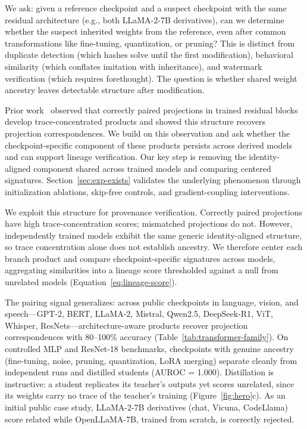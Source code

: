\documentclass[letterpaper]{article}
\begin{document}
We ask: given a reference checkpoint and a suspect checkpoint with the same residual architecture (e.g., both LLaMA-2-7B derivatives), can we determine whether the suspect inherited weights from the reference, even after common transformations like fine-tuning, quantization, or pruning? This is distinct from duplicate detection (which hashes solve until the first modification), behavioral similarity (which conflates imitation with inheritance), and watermark verification (which requires forethought). The question is whether shared weight ancestry leaves detectable structure after modification.

Prior work~\citep{park2026idroppedneuralnet} observed that correctly paired projections in trained residual blocks develop trace-concentrated products and showed this structure recovers projection correspondences. We build on this observation and ask whether the checkpoint-specific component of these products persists across derived models and can support lineage verification. Our key step is removing the identity-aligned component shared across trained models and comparing centered signatures. Section~\ref{sec:exp-exists} validates the underlying phenomenon through initialization ablations, skip-free controls, and gradient-coupling interventions.

We exploit this structure for provenance verification. Correctly paired projections have high trace-concentration scores; mismatched projections do not. However, independently trained models exhibit the same generic identity-aligned structure, so trace concentration alone does not establish ancestry. We therefore center each branch product and compare checkpoint-specific signatures across models, aggregating similarities into a lineage score thresholded against a null from unrelated models (Equation~\ref{eq:lineage-score}).

The pairing signal generalizes: across public checkpoints in language, vision, and speech---GPT-2, BERT, LLaMA-2, Mistral, Qwen2.5, DeepSeek-R1, ViT, Whisper, ResNets---architecture-aware products recover projection correspondences with 80--100\% accuracy (Table~\ref{tab:transformer-family}). On controlled MLP and ResNet-18 benchmarks, checkpoints with genuine ancestry (fine-tuning, noise, pruning, quantization, LoRA merging) separate cleanly from independent runs and distilled students (AUROC = 1.000). Distillation is instructive: a student replicates its teacher's outputs yet scores unrelated, since its weights carry no trace of the teacher's training (Figure~\ref{fig:hero}c). As an initial public case study, LLaMA-2-7B derivatives (chat, Vicuna, CodeLlama) score related while OpenLLaMA-7B, trained from scratch, is correctly rejected.
\end{document}
